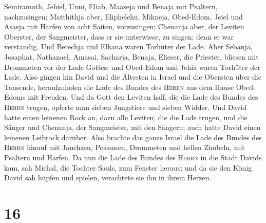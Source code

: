 Semiramoth, Jehiel, Unni, Eliab, Maaseja und Benaja mit Psaltern,
nachzusingen;  Matthithja aber, Eliphelehu, Mikneja,
Obed-Edom, Jeiel und Asasja mit Harfen von acht Saiten, vorzusingen;
 Chenanja aber, der Leviten Oberster, der Sangmeister,
dass er sie unterwiese, zu singen; denn er war verständig.
 Und Berechja und Elkana waren Torhüter der Lade.
 Aber Sebanja, Josaphat, Nathanael, Amasai, Sacharja,
Benaja, Elieser, die Priester, bliesen mit Drommeten vor der Lade
Gottes; und Obed-Edom und Jehia waren Torhüter der Lade. 
Also gingen hin David und die Ältesten in Israel und die Obersten über
die Tausende, heraufzuholen die Lade des Bundes des \textsc{Herrn} aus
dem Hause Obed-Edoms mit Freuden.  Und da Gott den
Leviten half, die die Lade des Bundes des \textsc{Herrn} trugen, opferte
man sieben Jungstiere und sieben Widder.  Und David hatte
einen leinenen Rock an, dazu alle Leviten, die die Lade trugen, und die
Sänger und Chenanja, der Sangmeister, mit den Sängern; auch hatte David
einen leinenen Leibrock darüber.  Also brachte das ganze
Israel die Lade des Bundes des \textsc{Herrn} hinauf mit Jauchzen,
Posaunen, Drommeten und hellen Zimbeln, mit Psaltern und Harfen.
 Da nun die Lade des Bundes des \textsc{Herrn} in die
Stadt Davids kam, sah Michal, die Tochter Sauls, zum Fenster heraus; und
da sie den König David sah hüpfen und spielen, verachtete sie ihn in
ihrem Herzen.

\hypertarget{section-15}{%
\section{16}\label{section-15}}

